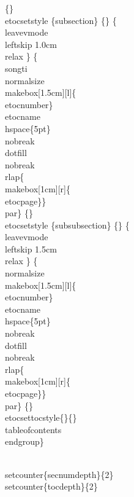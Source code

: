 \documentclass{hnuthesis}%
\begin{document}
\begin{nowebtrunk}
\{\}
\\etocsetstyle \{subsection\}
\{\}
\{\\leavevmode\\leftskip 1.0cm\\relax \}
\{\\songti\\normalsize\\makebox[1.5cm][l]\{\\etocnumber\}%
    \\etocname\\hspace\{5pt\}\\nobreak\\dotfill\\nobreak
    \\rlap\{\\makebox[1cm][r]\{\\etocpage\}\}\\par\}
\{\}
\\etocsetstyle \{subsubsection\}
\{\}
\{\\leavevmode\\leftskip 1.5cm\\relax \}
\{\\normalsize\\makebox[1.5cm][l]\{\\etocnumber\}%
    \\etocname\\hspace\{5pt\}\\nobreak\\dotfill\\nobreak
    \\rlap\{\\makebox[1cm][r]\{\\etocpage\}\}\\par\}
\{\}
\\etocsettocstyle\{\}\{\}
\\tableofcontents
\\endgroup\}

\\setcounter\{secnumdepth\}\{2\}  
\\setcounter\{tocdepth\}\{2\}  
\nwendcode{}\end{nowebtrunk}
\end{document}
